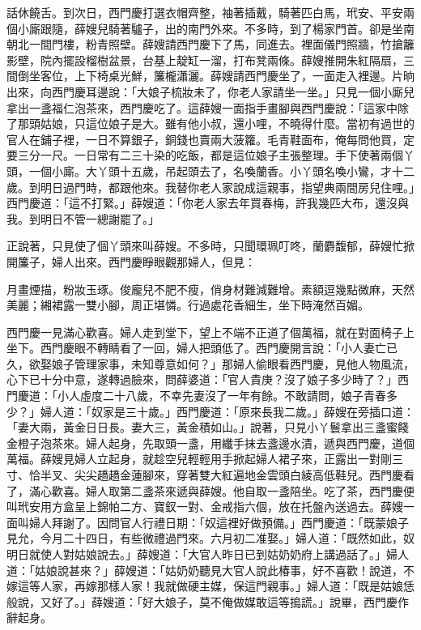 話休饒舌。到次日，西門慶打選衣帽齊整，袖著插戴，騎著匹白馬，玳安、平安兩個小廝跟隨，薛嫂兒騎著驢子，出的南門外來。不多時，到了楊家門首。卻是坐南朝北一間門樓，粉青照壁。薛嫂請西門慶下了馬，同進去。裡面儀門照牆，竹搶籬影壁，院內擺設榴樹盆景，台基上靛缸一溜，打布凳兩條。薛嫂推開朱紅隔扇，三間倒坐客位，上下椅桌光鮮，簾櫳瀟灑。薛嫂請西門慶坐了，一面走入裡邊。片晌出來，向西門慶耳邊說：「大娘子梳妝未了，你老人家請坐一坐。」只見一個小廝兒拿出一盞福仁泡茶來，西門慶吃了。這薛嫂一面指手畫腳與西門慶說：「這家中除了那頭姑娘，只這位娘子是大。雖有他小叔，還小哩，不曉得什麼。當初有過世的官人在鋪子裡，一日不算銀子，銅錢也賣兩大菠籮。毛青鞋面布，俺每問他買，定要三分一尺。一日常有二三十染的吃飯，都是這位娘子主張整理。手下使著兩個丫頭，一個小廝。大丫頭十五歲，吊起頭去了，名喚蘭香。小丫頭名喚小鸞，才十二歲。到明日過門時，都跟他來。我替你老人家說成這親事，指望典兩間房兒住哩。」西門慶道：「這不打緊。」薛嫂道：「你老人家去年買春梅，許我幾匹大布，還沒與我。到明日不管一總謝罷了。」

正說著，只見使了個丫頭來叫薛嫂。不多時，只聞環珮叮咚，蘭麝馥郁，薛嫂忙掀開簾子，婦人出來。西門慶睜眼觀那婦人，但見：

月畫煙描，粉妝玉琢。俊龐兒不肥不瘦，俏身材難減難增。素額逗幾點微麻，天然美麗；緗裙露一雙小腳，周正堪憐。行過處花香細生，坐下時淹然百媚。

西門慶一見滿心歡喜。婦人走到堂下，望上不端不正道了個萬福，就在對面椅子上坐下。西門慶眼不轉睛看了一回，婦人把頭低了。西門慶開言說：「小人妻亡已久，欲娶娘子管理家事，未知尊意如何？」那婦人偷眼看西門慶，見他人物風流，心下已十分中意，遂轉過臉來，問薛婆道：「官人貴庚？沒了娘子多少時了？」西門慶道：「小人虛度二十八歲，不幸先妻沒了一年有餘。不敢請問，娘子青春多少？」婦人道：「奴家是三十歲。」西門慶道：「原來長我二歲。」薛嫂在旁插口道：「妻大兩，黃金日日長。妻大三，黃金積如山。」說著，只見小丫鬟拿出三盞蜜餞金橙子泡茶來。婦人起身，先取頭一盞，用纖手抹去盞邊水漬，遞與西門慶，道個萬福。薛嫂見婦人立起身，就趁空兒輕輕用手掀起婦人裙子來，正露出一對剛三寸、恰半叉、尖尖趫趫金蓮腳來，穿著雙大紅遍地金雲頭白綾高低鞋兒。西門慶看了，滿心歡喜。婦人取第二盞茶來遞與薛嫂。他自取一盞陪坐。吃了茶，西門慶便叫玳安用方盒呈上錦帕二方、寶釵一對、金戒指六個，放在托盤內送過去。薛嫂一面叫婦人拜謝了。因問官人行禮日期：「奴這裡好做預備。」西門慶道：「既蒙娘子見允，今月二十四日，有些微禮過門來。六月初二准娶。」婦人道：「既然如此，奴明日就使人對姑娘說去。」薛嫂道：「大官人昨日已到姑奶奶府上講過話了。」婦人道：「姑娘說甚來？」薛嫂道：「姑奶奶聽見大官人說此椿事，好不喜歡！說道，不嫁這等人家，再嫁那樣人家！我就做硬主媒，保這門親事。」婦人道：「既是姑娘恁般說，又好了。」薛嫂道：「好大娘子，莫不俺做媒敢這等搗謊。」說畢，西門慶作辭起身。

